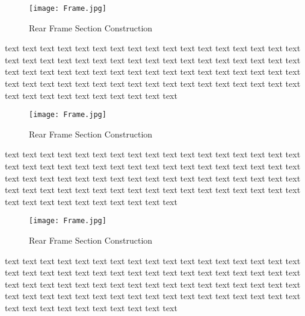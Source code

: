 \begin{figure}[H]
	\centering
	\texttt{[image: Frame.jpg]}
	\caption{Rear Frame Section Construction}
	\label{fig:2}
\end{figure}

text text text text text text text text text text text text text text text text text text text text text text text text text text text text text text text text text text text text text text text text text text text text text text text text text text text text text text text text text text text text text text text text text text text text text text text text text text text text text text 

\begin{figure}[H]
	\centering
	\texttt{[image: Frame.jpg]}
	\caption{Rear Frame Section Construction}
	\label{fig:3}
\end{figure}

text text text text text text text text text text text text text text text text text text text text text text text text text text text text text text text text text text text text text text text text text text text text text text text text text text text text text text text text text text text text text text text text text text text text text text text text text text text text text text 

\begin{figure}[H]
	\centering
	\texttt{[image: Frame.jpg]}
	\caption{Rear Frame Section Construction}
	\label{fig:4}
\end{figure}

text text text text text text text text text text text text text text text text text text text text text text text text text text text text text text text text text text text text text text text text text text text text text text text text text text text text text text text text text text text text text text text text text text text text text text text text text text text text text text 